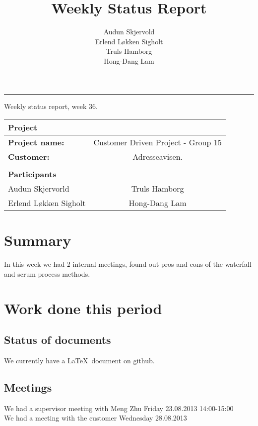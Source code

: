 \documentclass[12pt, a4paper]{article}
\title{Weekly Status Report}
\author{Audun Skjervold \\ Erlend Løkken Sigholt \\ Truls Hamborg \\ Hong-Dang Lam}
\begin{document}
\maketitle
\newpage

 
\newpage
\hrule
\newpage

\begin{center}
Weekly status report, week 36.
  \begin{tabular}{| l  c |}
    \hline
    Project & \\ \hline
    \textbf{Project name:} & Customer Driven Project - Group 15 \\
    \textbf{Customer:} & Adresseavisen. \\ \hline
     & \\
     \textbf{Participants} & \\ \hline
     Audun Skjervorld & Truls Hamborg \\
     Erlend Løkken Sigholt & Hong-Dang Lam \\
    \hline
  \end{tabular}
  \end{center}




\section{Summary}
In this week we had 2 internal meetings, found out pros and cons of the waterfall and scrum process methods.
\section{Work done this period}
\subsection{Status of documents}
We currently have a \LaTeX \ document on github.
\subsection{Meetings}
We had a supervisor meeting with Meng Zhu Friday 23.08.2013 14:00-15:00 \\
We had a meeting with the customer Wednesday 28.08.2013
\end{document}
